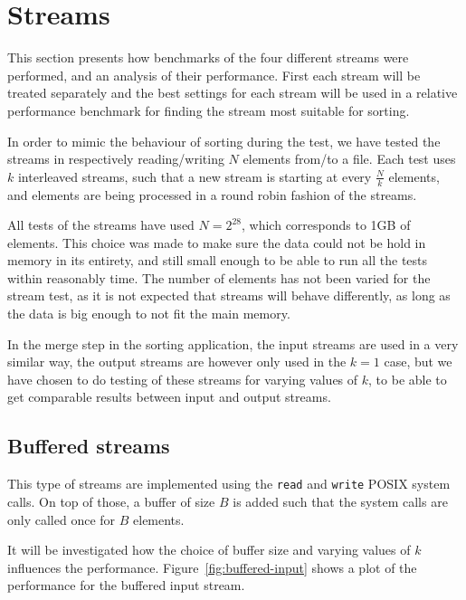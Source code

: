 \documentclass[a4paper,12pt]{article}
\begin{document}
\section{Streams}
This section presents how benchmarks of the four different
streams were performed, and an analysis of their performance. First each stream will
be treated separately and the best settings for each stream will be
used in a relative performance benchmark for finding the stream most
suitable for sorting.

In order to mimic the behaviour of sorting during the test, we have
tested the streams in respectively reading/writing $N$ elements from/to a file. Each test uses $k$ interleaved streams, such
that a new stream is starting at every $\frac{N}{k}$ elements, and
elements are being processed in a round robin fashion of the streams.

All tests of the streams have used $N = 2^{28}$, which corresponds to
1GB of elements. This choice was made to make sure the data could not be hold in memory in its entirety, and still small enough to be able to run all the tests within reasonably time. The
number of elements has not been varied for the stream test, as it is not
expected that streams will behave differently, as long as the data is
big enough to not fit the main memory.

In the merge step in the sorting application, the input streams are
used in a very similar way, the output streams are however only used
in the $k = 1$ case, but we have chosen to do testing of these streams
for varying values of $k$, to be able to get comparable results
between input and output streams.

\subsection{Buffered streams}
\label{sec:buffered-streams}
This type of streams are implemented using the \texttt{read} and
\texttt{write} POSIX system calls. On top of those, a buffer of size
$B$ is added such that the system calls are only called once for $B$ elements.

It will be investigated how the choice of buffer size and varying
values of $k$ influences the
performance. Figure~\ref{fig:buffered-input} shows a plot of the performance for the buffered input stream.
\end{document}
